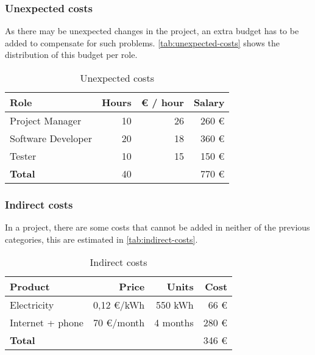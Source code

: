 \subsubsection{Unexpected costs}

As there may be unexpected changes in the project, an extra budget has to be added to compensate
for such problems. \autoref{tab:unexpected-costs} shows the distribution of this budget per role.

\begin{table}[H]
  \centering
  \begin{tabular}{|l|r|r|r|}
    \hline
    \textbf{Role} & \textbf{Hours} & \textbf{€ / hour} & \textbf{Salary} \\ \hline\hline
    Project Manager & 10 & 26 & 260 € \\ \hline
    Software Developer & 20 & 18 & 360 € \\ \hline
    Tester & 10 & 15 & 150 € \\ \hline

    \hline\hline
    \textbf{Total} & 40 & & 770 € \\ 
    \hline
  \end{tabular}
  \caption{Unexpected costs \label{tab:unexpected-costs}}
\end{table}

\subsubsection{Indirect costs}

In a project, there are some costs that cannot be added in neither of the previous categories,
this are estimated in \autoref{tab:indirect-costs}.

\begin{table}[H]
  \centering
  \begin{tabular}{|l|r|r|r|}
    \hline
    \textbf{Product} & \textbf{Price} & \textbf{Units} & \textbf{Cost} \\ \hline\hline

    Electricity & 0,12 €/kWh & 550 kWh & 66 € \\ \hline
    Internet + phone & 70 €/month & 4 months & 280 € \\ \hline
    
    \hline\hline
    \textbf{Total} & & & 346 € \\ \hline
  \end{tabular}
  \caption{Indirect costs \label{tab:indirect-costs}}
\end{table}

